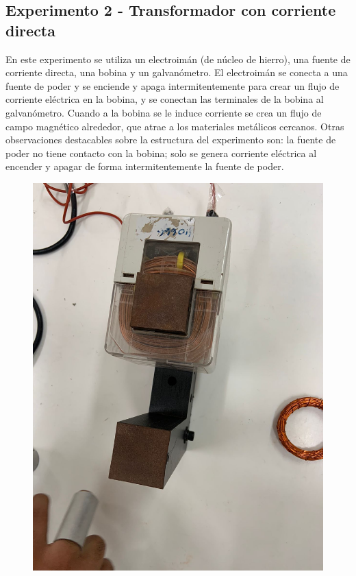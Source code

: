 \documentclass[twocolumn, 12pt]{article}
\begin{document}
\subsection*{Experimento 2 - Transformador con corriente directa}

En este experimento se utiliza un electroimán (de núcleo de
hierro), una fuente de corriente directa, una bobina y un
galvanómetro. El electroimán se conecta a una fuente de
poder y se enciende y apaga intermitentemente para crear un
flujo de corriente eléctrica en la bobina, y se conectan
las terminales de la bobina al galvanómetro. Cuando a la
bobina se le induce corriente se crea un flujo de campo
magnético alrededor, que atrae a los materiales metálicos
cercanos. Otras observaciones destacables sobre la
estructura del experimento son: la fuente de poder no tiene
contacto con la bobina; solo se genera corriente eléctrica
al encender y apagar de forma intermitentemente la fuente
de poder.

\begin{figure}[H]
	\includegraphics*[width=0.9\linewidth]{./Images/Electroiman.jpeg}
\end{figure}
\end{document}
